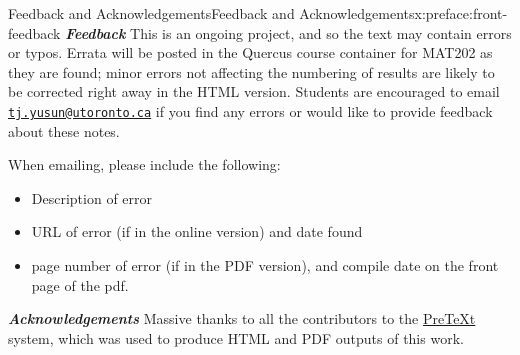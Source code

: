\documentclass[oneside,10pt,]{book}
\newcommand{\mono}[1]{\texttt{#1}}
\newcommand{\alert}[1]{\textbf{\textit{#1}}}
\numberwithin{equation}{section}
\begin{document}
%
%
\typeout{************************************************}
\typeout{************************************************}
%
\begin{preface}{Feedback and Acknowledgements}{}{Feedback and Acknowledgements}{}{}{x:preface:front-feedback}
\alert{Feedback} This is an ongoing project, and so the text may contain errors or typos. Errata will be posted in the Quercus course container for MAT202 as they are found; minor errors not affecting the numbering of results are likely to be corrected right away in the HTML version. Students are encouraged to email \href{mailto:tj.yusun@utoronto.ca?subject=202notes-pretext}{\mono{tj.yusun@utoronto.ca}} if you find any errors or would like to provide feedback about these notes.%
\par
When emailing, please include the following:%
\begin{itemize}[label=\textbullet]
\item{}Description of error%
\item{}URL of error (if in the online version) and date found%
\item{}page number of error (if in the PDF version), and compile date on the front page of the pdf.%
\end{itemize}
%
\par
\alert{Acknowledgements} Massive thanks to all the contributors to the \href{https://pretextbook.org/}{PreTeXt} system, which was used to produce HTML and PDF outputs of this work.%
\end{preface}
\setcounter{tocdepth}{1}
\renewcommand*\contentsname{Contents}
\tableofcontents
\mainmatter
%
%
\typeout{************************************************}
\typeout{************************************************}
%
\end{document}
